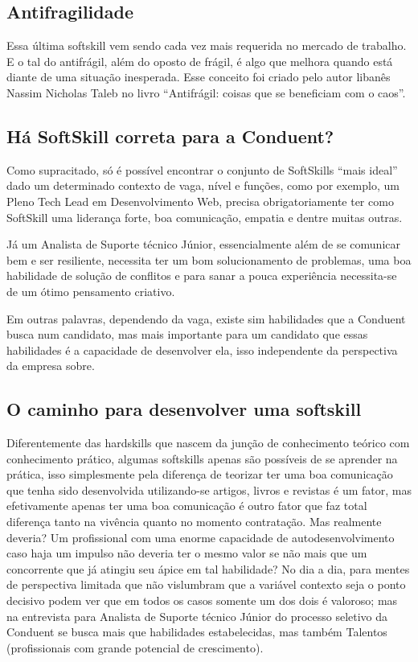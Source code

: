 \documentclass[12pt]{article}
\begin{document}
\subsection{Antifragilidade}

Essa última softskill vem sendo cada vez mais requerida no mercado de trabalho. E o tal do antifrágil, além do oposto de frágil, é algo que melhora quando está diante de uma situação inesperada. Esse conceito foi criado pelo autor libanês Nassim Nicholas Taleb no livro “Antifrágil: coisas que se beneficiam com o caos”.

\subsection{Há SoftSkill correta para a Conduent?} 

Como supracitado, só é possível encontrar o conjunto de SoftSkills “mais ideal” dado um determinado contexto de vaga, nível e funções, como por exemplo, um Pleno Tech Lead em Desenvolvimento Web, precisa obrigatoriamente ter como SoftSkill uma liderança forte, boa comunicação, empatia e dentre muitas outras. 

Já um Analista de Suporte técnico Júnior, essencialmente além de se comunicar bem e ser resiliente, necessita ter um bom solucionamento de problemas, uma boa habilidade de solução de conflitos e para sanar a pouca experiência necessita-se de um ótimo pensamento criativo. 

Em outras palavras, dependendo da vaga, existe sim habilidades que a Conduent busca num candidato, mas mais importante para um candidato que essas habilidades é a capacidade de desenvolver ela, isso independente da perspectiva da empresa sobre.

\subsection{O caminho para desenvolver uma softskill} 

Diferentemente das hardskills que nascem da junção de conhecimento teórico com conhecimento prático, algumas softskills apenas são possíveis de se aprender na prática, isso simplesmente pela diferença de teorizar ter uma boa comunicação que tenha sido desenvolvida utilizando-se artigos, livros e revistas é um fator, mas efetivamente apenas ter uma boa comunicação é outro fator que faz total diferença tanto na vivência quanto no momento contratação. 
Mas realmente deveria? Um profissional com uma enorme capacidade de autodesenvolvimento caso haja um impulso não deveria ter o mesmo valor se não mais que um concorrente que já atingiu seu ápice em tal habilidade? No dia a dia, para mentes de perspectiva limitada que não vislumbram que a variável contexto seja o ponto decisivo podem ver que em todos os casos somente um dos dois é valoroso; mas na entrevista para Analista de Suporte técnico Júnior do processo seletivo da Conduent se busca mais que habilidades estabelecidas, mas também Talentos (profissionais com grande potencial de crescimento).
\end{document}
